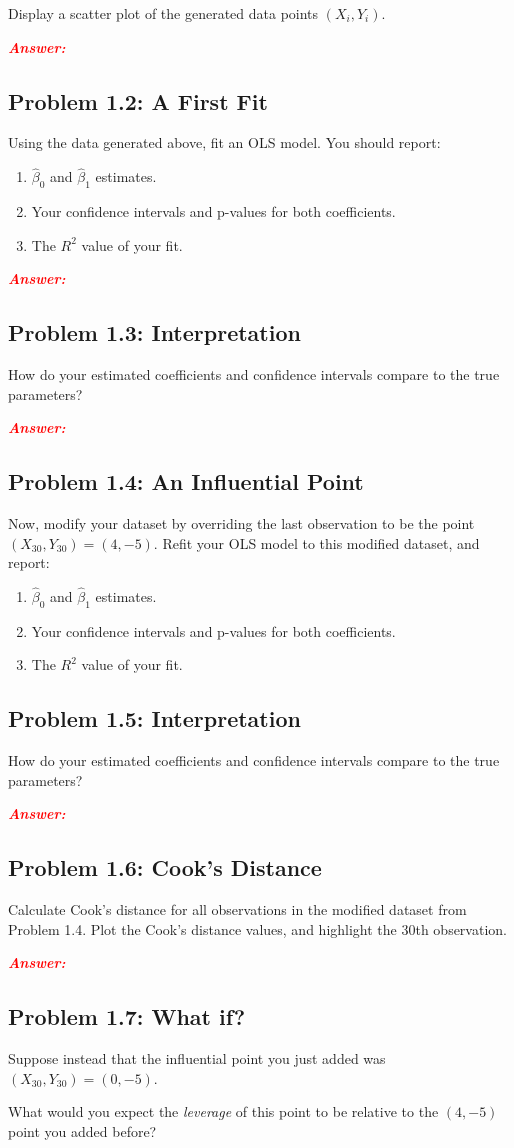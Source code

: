 \documentclass[11pt, letterpaper]{article}
\newcommand{\subproblem}[1]{\subsection*{Problem #1}}
\newcommand{\answer}{\textbf{\textit{\textcolor{red}{Answer:}}}\\}
\begin{document}
Display a scatter plot of the generated data points $(X_i, Y_i)$.

\answer

\subproblem{1.2: A First Fit}

Using the data generated above, fit an OLS model. You should report:
\begin{enumerate}
    \item $\hat{\beta}_0$ and $\hat{\beta}_1$ estimates.
    \item Your confidence intervals and p-values for both coefficients.
    \item The $R^2$ value of your fit.
\end{enumerate}

\answer

\subproblem{1.3: Interpretation}

How do your estimated coefficients and confidence intervals compare to the true parameters?

\answer

\subproblem{1.4: An Influential Point}

Now, modify your dataset by overriding the last observation to be the point $(X_{30}, Y_{30}) = (4, -5)$.
Refit your OLS model to this modified dataset, and report:
\begin{enumerate}
    \item $\hat{\beta}_0$ and $\hat{\beta}_1$ estimates.
    \item Your confidence intervals and p-values for both coefficients.
    \item The $R^2$ value of your fit.
\end{enumerate}

\subproblem{1.5: Interpretation}

How do your estimated coefficients and confidence intervals compare to the true parameters?

\answer

\subproblem{1.6: Cook's Distance}

Calculate Cook's distance for all observations in the modified dataset from Problem 1.4.
Plot the Cook's distance values, and highlight the 30th observation.

\answer

\subproblem{1.7: What if?}

Suppose instead that the influential point you just added was $(X_{30}, Y_{30}) = (0, -5)$.

What would you expect the \textit{leverage} of this point to be relative to the $(4, -5)$ point you added before?
\end{document}
